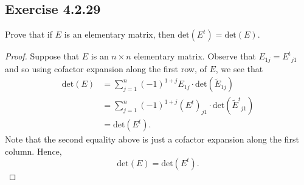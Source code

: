 \subsection*{Exercise 4.2.29} Prove that if \( E  \) is an elementary matrix, then \( \text{det}(E^{t}) = \text{det}(E) \).
\begin{proof}
Suppose that \( E  \) is an \( n \times n \) elementary matrix. Observe that \( {E}_{1j} = {E^{t}}_{j1} \) and so using cofactor expansion along the first row, of \( E  \), we see that 
\begin{align*}
    \text{det}(E) &= \sum_{ j=1 }^{ n } (-1)^{1 + j} {E}_{1j} \cdot \text{det}({\tilde{E}}_{1j}) \\
                  &= \sum_{ j=1 }^{ n } (-1)^{1 + j} (E^{t})_{j1} \cdot \text{det}({\tilde{E}^t}_{j1}) \\
                  &= \text{det}(E^{t}).
\end{align*}
Note that the second equality above is just a cofactor expansion along the first column. Hence, 
\[  \text{det}(E) = \text{det}(E^{t}). \]
\end{proof}


